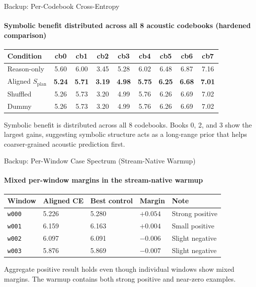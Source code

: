 \documentclass[aspectratio=169,11pt]{beamer}
\newcommand{\splan}{$S_{\mathrm{plan}}$}
\newcommand{\pos}[1]{{\bfseries\color{Green}#1}}
\newcommand{\bad}[1]{{\color{Red}#1}}
\begin{document}
\begin{frame}{Backup: Per-Codebook Cross-Entropy}
  \framesubtitle{Symbolic benefit distributed across all 8 acoustic codebooks (hardened comparison)}

  {\footnotesize
  \begin{tabular}{p{3.0cm}cccccccc}
    \toprule
    \textbf{Condition} & \textbf{cb0} & \textbf{cb1} & \textbf{cb2} & \textbf{cb3}
      & \textbf{cb4} & \textbf{cb5} & \textbf{cb6} & \textbf{cb7} \\
    \midrule
    Reason-only      & 5.60 & 6.00 & 3.45 & 5.28 & 6.02 & 6.48 & 6.87 & 7.16 \\
    \rowcolor{HLrow}
    Aligned \splan{} & \pos{5.24} & \pos{5.71} & \pos{3.19} & \pos{4.98}
      & \pos{5.75} & \pos{6.25} & \pos{6.68} & \pos{7.01} \\
    Shuffled         & 5.26 & 5.73 & 3.20 & 4.99 & 5.76 & 6.26 & 6.69 & 7.02 \\
    Dummy            & 5.26 & 5.73 & 3.20 & 4.99 & 5.76 & 6.26 & 6.69 & 7.02 \\
    \bottomrule
  \end{tabular}}

  \smallskip
  \begin{tcolorbox}[key]
    Symbolic benefit is distributed across all 8 codebooks.
    Books 0, 2, and 3 show the largest gains, suggesting symbolic structure acts as
    a long-range prior that helps coarser-grained acoustic prediction first.
  \end{tcolorbox}
\end{frame}

\begin{frame}{Backup: Per-Window Case Spectrum (Stream-Native Warmup)}
  \framesubtitle{Mixed per-window margins in the stream-native warmup}

  {\small\setlength{\tabcolsep}{4pt}
  \begin{tabular}{p{1.9cm}p{2.4cm}p{2.4cm}p{1.9cm}p{3.4cm}}
    \toprule
    \textbf{Window} & \textbf{Aligned CE} & \textbf{Best control} & \textbf{Margin} & \textbf{Note} \\
    \midrule
    \texttt{w000} & 5.226 & 5.280 & \pos{$+0.054$} & Strong positive \\
    \texttt{w001} & 6.159 & 6.163 & \pos{$+0.004$} & Small positive \\
    \texttt{w002} & 6.097 & 6.091 & \bad{$-0.006$} & Slight negative \\
    \texttt{w003} & 5.876 & 5.869 & \bad{$-0.007$} & Slight negative \\
    \bottomrule
  \end{tabular}}

  \smallskip
  \begin{tcolorbox}[key]
    Aggregate positive result holds even though individual windows show mixed margins.
    The warmup contains both strong positive and near-zero examples.
  \end{tcolorbox}
\end{frame}
\end{document}
